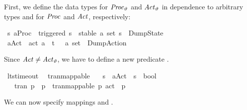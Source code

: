 \begin{isabellebody}
\begin{isamarkuptext}
First, we define the data types for $\mathit{Proc}_\vartheta$ and $\mathit{Act}_\vartheta$ in dependence to arbitrary types  and  for $\mathit{Proc}$ and $\mathit{Act}$, respectively:%
\end{isamarkuptext}\isamarkuptrue%
\isamarkupfalse%
\ {\isacharparenleft}{\kern0pt}{\isacharprime}{\kern0pt}s{\isacharcomma}{\kern0pt}\ {\isacharprime}{\kern0pt}a{\isacharparenright}{\kern0pt}Proc{\isacharunderscore}{\kern0pt}{\isasymtheta}\ {\isacharequal}{\kern0pt}\ triggered\ {\isacharprime}{\kern0pt}s\ {\isacharbar}{\kern0pt}\ stable\ {\isacartoucheopen}{\isacharprime}{\kern0pt}a\ set{\isacartoucheclose}\ {\isacharprime}{\kern0pt}s\ {\isacharbar}{\kern0pt}\ DumpState\isanewline
{}\isamarkupfalse%
\ {\isacharparenleft}{\kern0pt}{\isacharprime}{\kern0pt}a{\isacharparenright}{\kern0pt}Act{\isacharunderscore}{\kern0pt}{\isasymtheta}\ {\isacharequal}{\kern0pt}\ act\ {\isacharprime}{\kern0pt}a\ {\isacharbar}{\kern0pt}\ t{\isacharunderscore}{\kern0pt}{\isasymepsilon}\ {\isacharbar}{\kern0pt}\ {\isasymepsilon}\ {\isacartoucheopen}{\isacharprime}{\kern0pt}a\ set{\isacartoucheclose}\ {\isacharbar}{\kern0pt}\ DumpAction%
\begin{isamarkuptext}%
Since $\mathit{Act} \neq \mathit{Act}_\vartheta$, we have to define a new predicate .%
\end{isamarkuptext}\isamarkuptrue%
\isamarkupfalse%
\ lts{\isacharunderscore}{\kern0pt}timeout\ \isanewline
\isanewline
{}\isamarkupfalse%
\ tran{\isacharunderscore}{\kern0pt}mappable\isanewline
\ \ {\isacharcolon}{\kern0pt}{\isacharcolon}{\kern0pt}\ {\isacartoucheopen}{\isacharprime}{\kern0pt}s\ {\isasymRightarrow}\ {\isacharparenleft}{\kern0pt}{\isacharprime}{\kern0pt}a{\isacharparenright}{\kern0pt}Act{\isacharunderscore}{\kern0pt}{\isasymtheta}\ {\isasymRightarrow}\ {\isacharprime}{\kern0pt}s\ {\isasymRightarrow}\ bool{\isacartoucheclose}\ \isanewline
\ \ \ {\isacartoucheopen}tran\ p\ {\isasymalpha}\ p{\isacharprime}{\kern0pt}\ {\isasymLongrightarrow}\ tran{\isacharunderscore}{\kern0pt}mappable\ p\ {\isacharparenleft}{\kern0pt}act\ {\isasymalpha}{\isacharparenright}{\kern0pt}\ p{\isacharprime}{\kern0pt}{\isacartoucheclose}%
\begin{isamarkuptext}%
We can now specify mappings  and .%
\end{isamarkuptext}\isamarkuptrue%
\isamarkupfalse%

\end{isabellebody}

